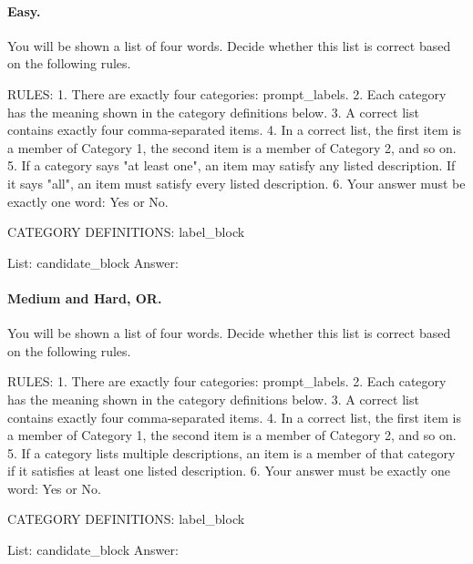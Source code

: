 \paragraph{Easy.}
\begin{promptbox}
You will be shown a list of four words. Decide whether this list is correct based on the following rules.

RULES:
1. There are exactly four categories: {prompt_labels}.
2. Each category has the meaning shown in the category definitions below.
3. A correct list contains exactly four comma-separated items.
4. In a correct list, the first item is a member of Category 1, the second item is a member of Category 2, and so on.
5. If a category says "at least one", an item may satisfy any listed description. If it says "all", an item must satisfy every listed description.
6. Your answer must be exactly one word: Yes or No.

CATEGORY DEFINITIONS:
{label_block}

List: {candidate_block}
Answer:
\end{promptbox}

\paragraph{Medium and Hard, OR.}
\begin{promptbox}
You will be shown a list of four words. Decide whether this list is correct based on the following rules.

RULES:
1. There are exactly four categories: {prompt_labels}.
2. Each category has the meaning shown in the category definitions below.
3. A correct list contains exactly four comma-separated items.
4. In a correct list, the first item is a member of Category 1, the second item is a member of Category 2, and so on.
5. If a category lists multiple descriptions, an item is a member of that category if it satisfies at least one listed description.
6. Your answer must be exactly one word: Yes or No.

CATEGORY DEFINITIONS:
{label_block}

List: {candidate_block}
Answer:
\end{promptbox}

